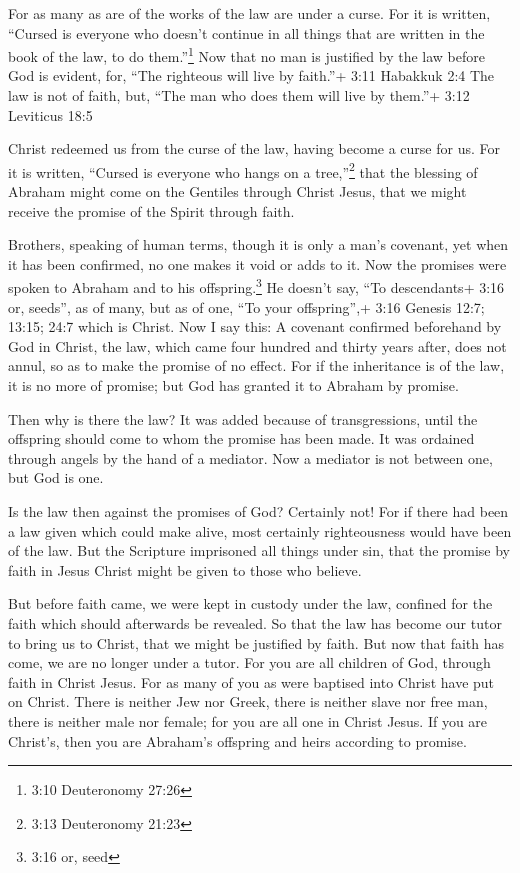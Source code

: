  For as many as are of the works of the law are under a
curse. For it is written, ``Cursed is everyone who doesn't continue in
all things that are written in the book of the law, to do
them.''\footnote{3:10 Deuteronomy 27:26}  Now that no man
is justified by the law before God is evident, for, ``The righteous will
live by faith.''+ 3:11 Habakkuk 2:4  The law is not of
faith, but, ``The man who does them will live by them.''+ 3:12 Leviticus
18:5

 Christ redeemed us from the curse of the law, having
become a curse for us. For it is written, ``Cursed is everyone who hangs
on a tree,''\footnote{3:13 Deuteronomy 21:23}  that the
blessing of Abraham might come on the Gentiles through Christ Jesus,
that we might receive the promise of the Spirit through faith.

 Brothers, speaking of human terms, though it is only a
man's covenant, yet when it has been confirmed, no one makes it void or
adds to it.  Now the promises were spoken to Abraham and to
his offspring.\footnote{3:16 or, seed} He doesn't say, ``To descendants+
3:16 or, seeds'', as of many, but as of one, ``To your offspring'',+
3:16 Genesis 12:7; 13:15; 24:7 which is Christ.  Now I say
this: A covenant confirmed beforehand by God in Christ, the law, which
came four hundred and thirty years after, does not annul, so as to make
the promise of no effect.  For if the inheritance is of the
law, it is no more of promise; but God has granted it to Abraham by
promise.

 Then why is there the law? It was added because of
transgressions, until the offspring should come to whom the promise has
been made. It was ordained through angels by the hand of a mediator.
 Now a mediator is not between one, but God is one.

 Is the law then against the promises of God? Certainly
not! For if there had been a law given which could make alive, most
certainly righteousness would have been of the law.  But
the Scripture imprisoned all things under sin, that the promise by faith
in Jesus Christ might be given to those who believe.

 But before faith came, we were kept in custody under the
law, confined for the faith which should afterwards be revealed.
 So that the law has become our tutor to bring us to
Christ, that we might be justified by faith.  But now that
faith has come, we are no longer under a tutor.  For you
are all children of God, through faith in Christ Jesus. 
For as many of you as were baptised into Christ have put on Christ.
 There is neither Jew nor Greek, there is neither slave nor
free man, there is neither male nor female; for you are all one in
Christ Jesus.  If you are Christ's, then you are Abraham's
offspring and heirs according to promise.

